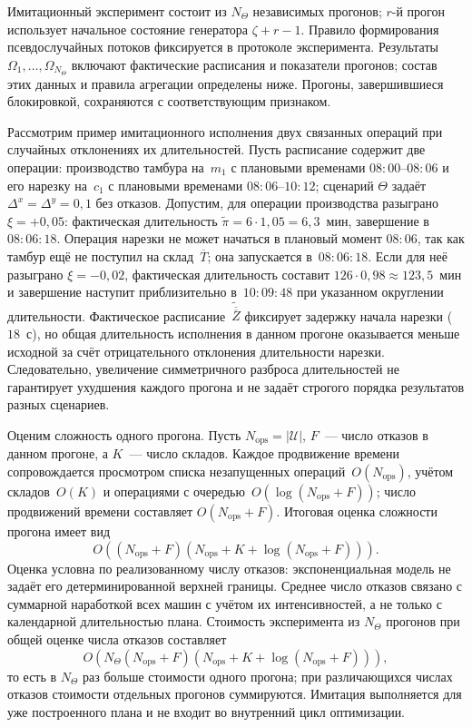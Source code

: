 Имитационный эксперимент состоит из $N_{\Theta}$ независимых прогонов; $r$-й прогон использует начальное состояние генератора $\zeta+r-1$. Правило формирования псевдослучайных потоков фиксируется в протоколе эксперимента. Результаты $\Omega_1,\ldots,\Omega_{N_{\Theta}}$ включают фактические расписания и показатели прогонов; состав этих данных и правила агрегации определены ниже. Прогоны, завершившиеся блокировкой, сохраняются с соответствующим признаком.

Рассмотрим пример имитационного исполнения двух связанных операций при случайных отклонениях их длительностей.
Пусть расписание содержит две операции: производство тамбура на~$m_1$ с плановыми временами $08\!:\!00$--$08\!:\!06$ и его нарезку на~$c_1$ с плановыми временами $08\!:\!06$--$10\!:\!12$; сценарий $\Theta$ задаёт $\Delta^{x}=\Delta^{y}=0{,}1$ без отказов.
Допустим, для операции производства разыграно $\xi=+0{,}05$: фактическая длительность $\widetilde{\pi}=6\cdot1{,}05=6{,}3$~мин, завершение в~$08\!:\!06\!:\!18$.
Операция нарезки не может начаться в плановый момент $08\!:\!06$, так как тамбур ещё не поступил на склад~$\overline{T}$; она запускается в~$08\!:\!06\!:\!18$.
Если для неё разыграно $\xi=-0{,}02$, фактическая длительность составит $126\cdot0{,}98\approx123{,}5$~мин и завершение наступит приблизительно в~$10\!:\!09\!:\!48$ при указанном округлении длительности.
Фактическое расписание~$\widetilde{\overline{\overline{Z}}}$ фиксирует задержку начала нарезки ($18$~с), но общая длительность исполнения в данном прогоне оказывается меньше исходной за счёт отрицательного отклонения длительности нарезки. Следовательно, увеличение симметричного разброса длительностей не гарантирует ухудшения каждого прогона и не задаёт строгого порядка результатов разных сценариев.

Оценим сложность одного прогона. Пусть $N_{\mathrm{ops}}=|\mathcal{U}|$, $F$~--- число отказов в данном прогоне, а $K$~--- число складов. Каждое продвижение времени сопровождается просмотром списка незапущенных операций~$O(N_{\mathrm{ops}})$, учётом складов~$O(K)$ и операциями с очередью~$O(\log(N_{\mathrm{ops}}+F))$; число продвижений времени составляет $O(N_{\mathrm{ops}}+F)$. Итоговая оценка сложности прогона имеет вид
\[
O\!\left((N_{\mathrm{ops}}+F)\left(N_{\mathrm{ops}}+K+
\log(N_{\mathrm{ops}}+F)\right)\right).
\]
Оценка условна по реализованному числу отказов: экспоненциальная модель не задаёт его детерминированной верхней границы. Среднее число отказов связано с суммарной наработкой всех машин с учётом их интенсивностей, а не только с календарной длительностью плана. Стоимость эксперимента из $N_{\Theta}$ прогонов при общей оценке числа отказов составляет
\[
O\!\left(N_{\Theta}(N_{\mathrm{ops}}+F)\left(N_{\mathrm{ops}}+K+
\log(N_{\mathrm{ops}}+F)\right)\right),
\]
то есть в $N_{\Theta}$ раз больше стоимости одного прогона; при различающихся числах отказов стоимости отдельных прогонов суммируются. Имитация выполняется для уже построенного плана и не входит во внутренний цикл оптимизации.

